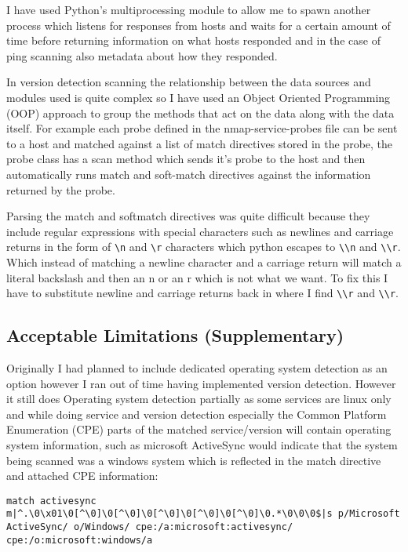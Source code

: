 \documentclass[titlepage]{article}
\begin{document}
I have used Python's multiprocessing module to allow me to spawn another process which listens
for responses from hosts and waits for a certain amount of time before returning information
on what hosts responded and in the case of ping scanning also metadata about how they responded.

In version detection scanning the relationship between the data sources and modules used is quite
complex so I have used an Object Oriented Programming (OOP) approach to group the methods
that act on the data along with the data itself. For example each probe defined in the nmap-service-probes
file can be sent to a host and matched against a list of match directives stored in the probe,
the probe class has a scan method which sends it's probe to the host and then automatically runs
match and soft-match directives against the information returned by the probe.

Parsing the match and softmatch directives was quite difficult because they include regular
expressions with special characters such as newlines and carriage returns in the form of
\verb|\n| and \verb|\r| characters which python escapes to \verb|\\n|
and \verb|\\r|. Which instead of matching a newline character and a carriage return
will match a literal backslash and then an n or an r which is not what we want. To fix this I have to substitute
newline and carriage returns back in where I find \verb|\\r| and \verb|\\r|.

\subsection{Acceptable Limitations (Supplementary)}

Originally I had planned to include dedicated operating system detection as an option
however I ran out of time having implemented version detection. However it still does
Operating system detection partially as some services are linux only and while doing
service and version detection especially the Common Platform Enumeration (CPE) parts
of the matched service/version will contain operating system information, such as
microsoft ActiveSync would indicate that the system being scanned was a windows system
which is reflected in the match directive and attached CPE information: 

\texttt{match activesync m|{\textasciicircum}.{\textbackslash}0{\textbackslash}x01{\textbackslash}0[{\textasciicircum}{\textbackslash}0]{\textbackslash}0[{\textasciicircum}{\textbackslash}0]{\textbackslash}0[{\textasciicircum}{\textbackslash}0]{\textbackslash}0[{\textasciicircum}{\textbackslash}0]{\textbackslash}0[{\textasciicircum}{\textbackslash}0]{\textbackslash}0.*{\textbackslash}0{\textbackslash}0{\textbackslash}0\$|s p/Microsoft ActiveSync/ o/Windows/ cpe:/a:microsoft:activesync/ cpe:/o:microsoft:windows/a}
\end{document}
